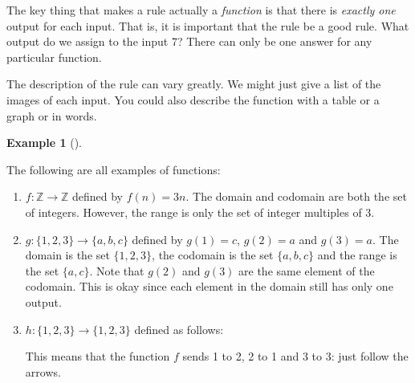 \documentclass[10pt,]{book}
\theoremstyle{plain}
\theoremstyle{definition}
\newtheorem{example}[theorem]{Example}
\theoremstyle{definition}
\theoremstyle{definition}
\numberwithin{equation}{section}
\def\Z{\mathbb Z}
\begin{document}
      The key thing that makes a rule actually a \emph{function} is that there is \emph{exactly one} output for each input. That is, it is important that the rule be a good rule. What output do we assign to the input 7? There can only be one answer for any particular function.
\par

      The description of the rule can vary greatly. We might just give a list of the images of each input. You could also describe the function with a table or a graph or in words.
\begin{example}[]\label{example-16}

          The following are all examples of functions:

          \leavevmode%
\begin{enumerate}
\item\hypertarget{li-276}{}\(f:\Z \to \Z\) defined by \(f(n) = 3n\). The domain and codomain are both the set of integers. However, the range is only the set of integer multiples of 3.%
\item\hypertarget{li-277}{}\(g: \{1,2,3\} \to \{a,b,c\}\) defined by \(g(1) = c\), \(g(2) = a\) and \(g(3) = a\). The domain is the set \(\{1,2,3\}\), the codomain is the set \(\{a,b,c\}\) and the range is the set \(\{a,c\}\). Note that \(g(2)\) and \(g(3)\) are the same element of the codomain. This is okay since each element in the domain still has only one output.%
\item\hypertarget{li-278}{}\(h:\{1,2,3\} \to \{1,2,3\}\) defined as follows:

                \leavevmode%
\begin{figure}
\centering
{
}
\end{figure}

                This means that the function \(f\) sends 1 to 2, 2 to 1 and 3 to 3: just follow the arrows.

\end{enumerate}

\end{example}
\par
\end{document}
